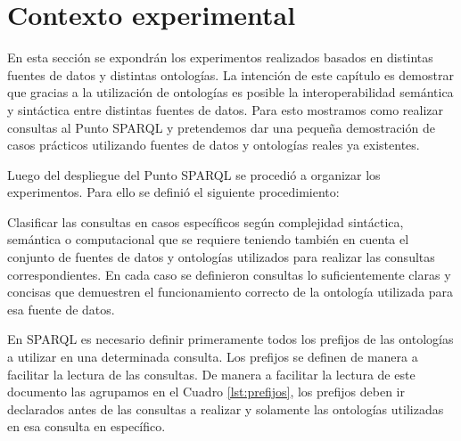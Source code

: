 \chapter{Contexto experimental}
\label{chap:Contexto experimental}


En esta sección se expondrán los experimentos realizados basados en distintas fuentes de datos y distintas ontologías. La intención de este capítulo es demostrar que gracias a la utilización de ontologías es posible la interoperabilidad semántica y sintáctica entre distintas fuentes de datos. Para esto mostramos como realizar consultas al Punto SPARQL y pretendemos dar una pequeña demostración de casos prácticos utilizando fuentes de datos y ontologías reales ya existentes. 

Luego del despliegue del Punto SPARQL se procedió a organizar los experimentos. Para ello se definió el siguiente procedimiento:

Clasificar las consultas en casos específicos según complejidad sintáctica, semántica o computacional que se requiere teniendo también en cuenta el conjunto de fuentes de datos y ontologías utilizados para realizar las consultas correspondientes.
En cada caso se definieron consultas lo suficientemente claras y concisas que demuestren el funcionamiento correcto de la ontología utilizada para esa fuente de datos.

En SPARQL es necesario definir primeramente todos los prefijos de las ontologías a utilizar en una determinada consulta. Los prefijos se definen de manera a facilitar la lectura de las consultas. De manera a facilitar la lectura de este documento las agrupamos en el Cuadro \ref{lst:prefijos}, los prefijos deben ir declarados antes de las consultas a realizar y solamente las ontologías utilizadas en esa consulta en específico.



